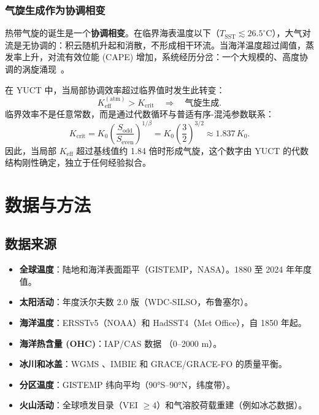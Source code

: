 \documentclass[12pt,a4paper]{article}
\newcommand{\Keff}{K_{\mathrm{eff}}}
\begin{document}
	\subsubsection*{气旋生成作为协调相变}
	
	热带气旋的诞生是一个\textbf{协调相变}。在临界海表温度以下（$T_{\mathrm{SST}} \lesssim 26.5^{\circ}\mathrm{C}$），大气对流是无协调的：积云随机升起和消散，不形成相干环流。当海洋温度超过阈值，蒸发率上升，对流有效位能 (CAPE) 增加，系统经历分岔：一个大规模的、高度协调的涡旋涌现~\cite{Emanuel2003}。
	
	在 YUCT 中，当局部协调效率超过临界值时发生此转变：
	\begin{equation}
		\Keff^{\mathrm{(atm)}} > K_{\mathrm{crit}} \quad \Longrightarrow \quad
		\text{气旋生成}.
	\end{equation}
	临界效率不是任意常数，而是通过代数循环与普适有序-混沌参数联系：
	\begin{equation}
		K_{\mathrm{crit}} = K_0 \left( \frac{S_{\mathrm{odd}}}{S_{\mathrm{even}}} \right)^{1/\beta}
		= K_0 \left( \frac{3}{2} \right)^{3/2} \approx 1.837\,K_0 .
	\end{equation}
	因此，当局部 $K_{\mathrm{eff}}$ 超过基线值约 1.84 倍时形成气旋，这个数字由 YUCT 的代数结构刚性确定，独立于任何经验拟合。
	
	\section{数据与方法}
	
	\subsection{数据来源}
	
	\begin{itemize}
		\item \textbf{全球温度}：陆地和海洋表面距平（GISTEMP，NASA）\cite{GISTEMP}。1880 至 2024 年年度值。
		\item \textbf{太阳活动}：年度沃尔夫数 2.0 版（WDC‑SILSO，布鲁塞尔）\cite{SILSO}。
		\item \textbf{海洋温度}：ERSSTv5（NOAA）和 HadSST4（Met Office）\cite{ERSST, HADSST}，自 1850 年起。
		\item \textbf{海洋热含量 (OHC)}：IAP/CAS 数据 \cite{IAPOHC}（0–2000 m）。
		\item \textbf{冰川和冰盖}：WGMS \cite{WGMS}、IMBIE \cite{IMBIE} 和 GRACE/GRACE-FO \cite{GRACE} 的质量平衡。
		\item \textbf{分区温度}：GISTEMP 纬向平均（90°S–90°N，纬度带）\cite{GISTEMPZonal}。
		\item \textbf{火山活动}：全球喷发目录（VEI \(\ge 4\)）和气溶胶荷载重建（例如冰芯数据）\cite{VolcanoCatalog}。
	\end{itemize}
	
\end{document}
